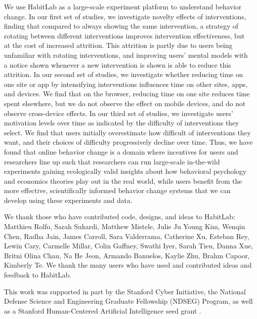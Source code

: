 We use HabitLab as a large-scale experiment platform to understand behavior change. In our first set of studies, we investigate novelty effects of interventions, finding that compared to always showing the same intervention, a strategy of rotating between different interventions improves intervention effectiveness, but at the cost of increased attrition. This attrition is partly due to users being unfamiliar with rotating interventions, and improving users' mental models with a notice shown whenever a new intervention is shown is able to reduce this attrition. In our second set of studies, we investigate whether reducing time on one site or app by intensifying interventions influences time on other sites, apps, and devices. We find that on the browser, reducing time on one site reduces time spent elsewhere, but we do not observe the effect on mobile devices, and do not observe cross-device effects. In our third set of studies, we investigate users' motivation levels over time as indicated by the difficulty of interventions they select. We find that users initially overestimate how difficult of interventions they want, and their choices of difficulty progressively decline over time. Thus, we have found that online behavior change is a domain where incentives for users and researchers line up such that researchers can run large-scale in-the-wild experiments gaining ecologically valid insights about how behavioral psychology and economics theories play out in the real world, while users benefit from the more effective, scientifically informed behavior change systems that we can develop using these experiments and data.

 


We thank those who have contributed code, designs, and ideas to HabitLab: Matthieu Rolfo, Sarah Sukardi, Matthew Mistele, Julie Ju Young Kim, Wenqin Chen, Radha Jain, James Carroll, Sara Valderrama, Catherine Xu, Esteban Rey, Lewin Cary, Carmelle Millar, Colin Gaffney, Swathi Iyer, Sarah Tieu, Danna Xue, Britni Olina Chau, Na He Jeon, Armando Banuelos, Kaylie Zhu, Brahm Capoor, Kimberly Te. We thank the many users who have used and contributed ideas and feedback to HabitLab.

This work was supported in part by the Stanford Cyber Initiative, the National Defense Science and Engineering Graduate Fellowship (NDSEG) Program, as well as a Stanford Human-Centered Artificial Intelligence seed grant . 

\afterpreface